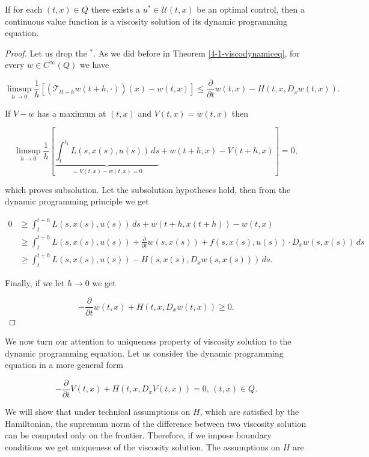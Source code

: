 \begin{theorem}
    If for each $(t,x)\in Q$ there exists a $u^{\ast}\in\mathcal{U}(t,x)$ be an optimal control, then a continuous value function is a viscosity solution of its dynamic programming equation.
    
    \begin{proof}
        Let us drop the $^{\ast}$. As we did before in Theorem \ref{4-1-viscodynamiceq}, for every $w\in C^{\infty}(Q)$ we have

        \[\limsup_{h\to0}\frac{1}{h}\left[(\mathcal{T}_{tt+h}w(t+h,\cdot))(x)-w(t,x)\right]\leq\frac{\partial}{\partial t}w(t,x) - H(t,x,D_xw(t,x)).\]

        If $V-w$ has a maximum at $(t,x)$ and $V(t,x)=w(t,x)$ then 

        \[\limsup_{h\to0}\frac{1}{h}\left[\underbrace{\int_t^{t_1} L(s,x(s),u(s))\,ds}_{=V(t,x)-w(t,x)=0} + w(t+h,x) - V(t+h,x)\right]=0,\]

        which proves subsolution. Let the subsolution hypotheses hold, then from the dynamic programming principle we get

        \begin{align*}
            0 & \geq \int_t^{t+h} L(s,x(s),u(s)) \,ds + w(t+h,x(t+h)) - w(t,x)\\ 
            & \geq  \int_t^{t+h} L(s,x(s),u(s)) + \frac{\partial}{\partial t}w(s,x(s)) + f(s,x(s),u(s))\cdot D_x w(s,x(s)) \,ds \\
            & \geq \int_t^{t+h} L(s,x(s),u(s)) - H(s,x(s),D_x w(s,x(s))) \,ds.
        \end{align*} 

        Finally, if we let $h\to0$ we get

        \[-\frac{\partial }{\partial t} w(t,x) + H(t,x,D_xw(t,x)) \geq 0.\]

    \end{proof}
\end{theorem}

We now turn our attention to uniqueness property of viscosity solution to the dynamic programming equation. Let us consider the dynamic programming equation 
in a more general form

\begin{equation}\label{4-2-firstordereq}
    -\frac{\partial}{\partial t}V(t,x) + H(t,x,D_xV(t,x)) = 0,\,(t,x)\in Q.
\end{equation}

We will show that under technical assumptions on $H$, which are satisfied by the Hamiltonian, the supremum norm of the difference between two viscosity solution 
can be computed only on the frontier. Therefore, if we impose boundary conditions we get uniqueness of the viscosity solution. 
The assumptions on $H$ are

